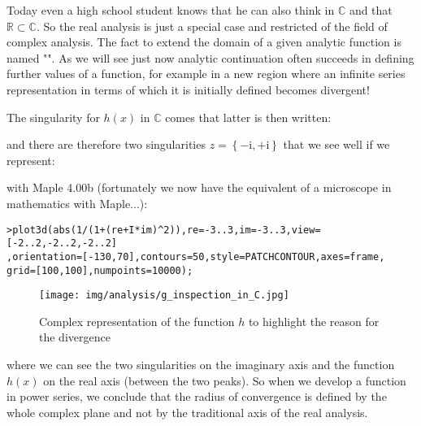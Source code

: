 	Today even a high school student knows that he can also think in $\mathbb{C}$ and that $\mathbb{R} \subset \mathbb{C}$. So the real analysis is just a special case and restricted of the field of complex analysis. The fact to extend the domain of a given analytic function is named "". As we will see just now analytic continuation often succeeds in defining further values of a function, for example in a new region where an infinite series representation in terms of which it is initially defined becomes divergent!
	
	The singularity for $h(x)$ in $\mathbb{C}$ comes that latter is then written:
	
	and there are therefore two singularities $z=\left\lbrace{-\mathrm{i},+\mathrm{i} }\right\rbrace$ that we see well if we represent:
	
	with Maple 4.00b (fortunately we now have the equivalent of a microscope in mathematics with Maple...):
	
	\texttt{>plot3d(abs(1/(1+(re+I*im)\string^2)),re=-3..3,im=-3..3,view=[-2..2,-2..2,-2..2]\\
	,orientation=[-130,70],contours=50,style=PATCHCONTOUR,axes=frame,\\
	grid=[100,100],numpoints=10000);}
	
	\begin{figure}[H]
		\begin{center}
			\texttt{[image: img/analysis/g\_inspection\_in\_C.jpg]}
		\end{center}	
		\caption[]{Complex representation of the function $h$ to highlight the reason for the divergence}
	\end{figure}
	where we can see the two singularities on the imaginary axis and the function $h (x)$ on the real axis (between the two peaks). So when we develop a function in power series, we conclude that the radius of convergence is defined by the whole complex plane and not by the traditional axis of the real analysis.
	
